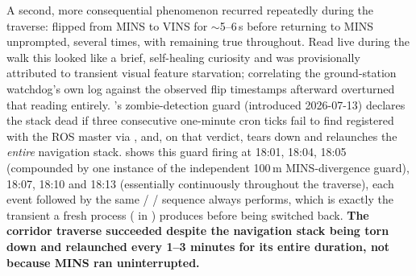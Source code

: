 A second, more consequential phenomenon recurred repeatedly during the
traverse:  flipped from MINS to VINS for $\sim$5--6\,s
before returning to MINS unprompted, several times, with 
remaining true throughout. Read live during the walk this looked like a
brief, self-healing curiosity and was provisionally attributed to transient
visual feature starvation; correlating the ground-station watchdog's own
log against the observed flip timestamps afterward overturned that reading
entirely. 's zombie-detection guard (introduced
2026-07-13) declares the stack dead if three consecutive one-minute cron
ticks fail to find  registered with the ROS master
via , and, on that verdict, tears down and relaunches the
\emph{entire} navigation stack.  shows this guard firing
at 18:01, 18:04, 18:05 (compounded by one instance of the independent
100\,m MINS-divergence guard), 18:07, 18:10 and 18:13 (essentially
continuously throughout the traverse), each event followed by the same
 /  /
 sequence  always performs,
which is exactly the transient a fresh  process
( in )
produces before being switched back. \textbf{The corridor traverse
succeeded despite the navigation stack being torn down and relaunched every
1--3 minutes for its entire duration, not because MINS ran uninterrupted.}

